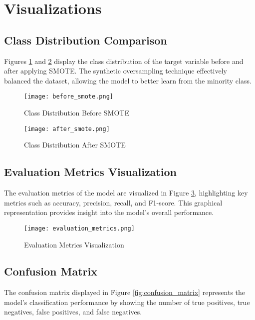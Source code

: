 \documentclass[a4paper,12pt]{article}
\begin{document}
	\section{Visualizations}
	\subsection{Class Distribution Comparison}
	Figures \ref{fig:before_smote} and \ref{fig:after_smote} display the class distribution of the target variable before and after applying SMOTE. The synthetic oversampling technique effectively balanced the dataset, allowing the model to better learn from the minority class.
	
	\begin{figure}[h!]
		\centering
		\texttt{[image: before\_smote.png]} %
		\caption{Class Distribution Before SMOTE}
		\label{fig:before_smote}
	\end{figure}
	
	\begin{figure}[h!]
		\centering
		\texttt{[image: after\_smote.png]} %
		\caption{Class Distribution After SMOTE}
		\label{fig:after_smote}
	\end{figure}
	
	\subsection{Evaluation Metrics Visualization}
	The evaluation metrics of the model are visualized in Figure \ref{fig:evaluation_metrics}, highlighting key metrics such as accuracy, precision, recall, and F1-score. This graphical representation provides insight into the model's overall performance.
	
	\begin{figure}[h!]
		\centering
		\texttt{[image: evaluation\_metrics.png]} %
		\caption{Evaluation Metrics Visualization}
		\label{fig:evaluation_metrics}
	\end{figure}
	
	\subsection{Confusion Matrix}
	The confusion matrix displayed in Figure \ref{fig:confusion_matrix} represents the model's classification performance by showing the number of true positives, true negatives, false positives, and false negatives.
	
\end{document}
